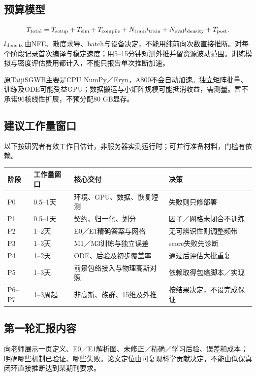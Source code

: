 \documentclass[UTF8,fontset=none,a4paper,11pt]{ctexart}
\begin{document}
\subsection{预算模型}
\[
T_{\rm total}=T_{\rm setup}+T_{\rm sim}+T_{\rm compile}
 +N_{\rm train}t_{\rm train}+N_{\rm eval}t_{\rm density}+T_{\rm post}.
\]
$t_{\rm density}$由NFE、散度求导、batch与设备决定，不能用纯前向次数直接推断。对每个阶段记录首次编译与稳定速度；用5--15分钟短测外推并留资源波动范围。训练模拟与密度评估费用都计入，不能只报告单次推断加速。

原TaijiSGWB主要是CPU NumPy／Eryn，A800不会自动加速。独立矩阵批量、训练及ODE可能受益GPU；数据搬运与小矩阵规模可能抵消收益，需测量。暂不承诺96核线性扩展，不预分配80 GB显存。
\subsection{建议工作量窗口}
以下按研究者有效工作日估计，非服务器实测运行时；可并行准备材料，门槛有依赖。
\par\noindent\begin{tabularx}{\linewidth}{p{17mm}p{25mm}YY}\toprule
阶段 & 工作量窗口 & 核心交付 & 决策\\\midrule
P0 & 0.5--1天 & 环境、GPU、数据、恢复短测 & 失败则只修部署\\
P1 & 0.5--1天 & 契约、归一化、划分 & 因子／网格未闭合不训练\\
P2 & 1--2天 & E0／E1精确答案与网格 & 无可辨识性则调整频带\\
P3 & 1--3天 & M1／M3训练与独立误差 & score失败先诊断\\
P4 & 1--2天 & ODE、后验及初步覆盖率 & 通过后评估大批重复\\
P5 & 1--3天 & 前景包络接入与物理高斯对照 & 依赖取得包络脚本／实现\\
P6--P7 & 1--3周起 & 非高斯、族群、15维及外推 & 按结果决定，不设完成保证\\\bottomrule
\end{tabularx}\par
\subsection{第一轮汇报内容}
向老师展示一页定义、E0／E1解析图、未修正／精确／学习后验、误差和成本；明确哪些机制已验证、哪些失败。论文定位由可复现科学贡献决定，不能由低保真闭环直接推断达到某期刊要求。
\clearpage
\end{document}
